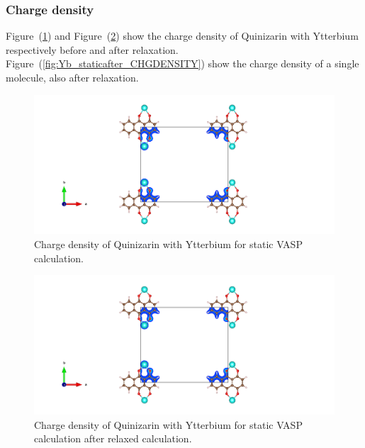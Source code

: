 \documentclass{article}
\begin{document}
      \vspace{1cm}

    \subsubsection{Charge density}

      Figure~(\ref{fig:Yb_staticbefore_CHGCAR}) and Figure~(\ref{fig:Yb_staticafter_CHGCAR}) show the charge density of Quinizarin with Ytterbium respectively before and after relaxation. Figure~(\ref{fig:Yb_staticafter_CHGDENSITY}) show the charge density of a single molecule, also after relaxation. \\

      \begin{figure}[H]
          \centering
          \includegraphics[width = \textwidth]{../fig/Yb_staticbefore_CHGCAR.png}
          \caption{Charge density of Quinizarin with Ytterbium for static VASP calculation. }
          \label{fig:Yb_staticbefore_CHGCAR}
      \end{figure}

      \begin{figure}[H]
          \centering
          \includegraphics[width = \textwidth]{../fig/Yb_staticafter_CHGCAR.png}
          \caption{Charge density of Quinizarin with Ytterbium for static VASP calculation after relaxed calculation. }
          \label{fig:Yb_staticafter_CHGCAR}
      \end{figure}
\end{document}
